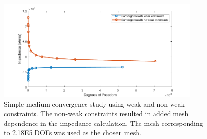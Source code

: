 \begin{figure}[h]
    \centering
    \includegraphics[width=0.9\textwidth]{images/simpeMediumConvergenceNoValidation.png}
    \caption[Simple medium convergence study]{Simple medium convergence study using weak and non-weak constraints. The non-weak constraints resulted in added mesh dependence in the impedance calculation. The mesh corresponding to 2.18E5 DOFs was used as the chosen mesh.}
    \label{fig:simple_medium_convergence}
\end{figure}

